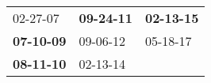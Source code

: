 \begin{supertabular}{p{0.33\columnwidth}p{0.33\columnwidth}p{0.33\columnwidth}}
          02-27-07\textsuperscript{} &  \textbf{09-24-11\textsuperscript{}} &  \textbf{02-13-15\textsuperscript{}} \\
 \textbf{07-10-09\textsuperscript{}} &           09-06-12\textsuperscript{} &           05-18-17\textsuperscript{} \\
 \textbf{08-11-10\textsuperscript{}} &           02-13-14\textsuperscript{} &                                      \\
\end{supertabular}
